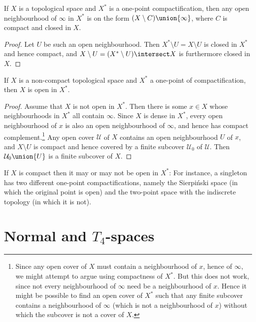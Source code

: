 \documentclass[article, a4paper, 11pt, oneside]{memoir}
\numberwithin{equation}{chapter}
\newcommand{\calU}{\mathcal{U}}
\begin{document}
\begin{lemma}
    If $X$ is a topological space and $X^*$ is a one-point compactification, then any open neighbourhood of $\infty$ in $X^*$ is on the form $(X \setminus C) \union \{\infty\}$, where $C$ is compact and closed in $X$.
\end{lemma}

\begin{proof}
    Let $U$ be such an open neighbourhood. Then $X^* \setminus U = X \setminus U$ is closed in $X^*$ and hence compact, and $X \setminus U = (X^* \setminus U) \intersect X$ is furthermore closed in $X$.
\end{proof}


\begin{lemma}
    If $X$ is a non-compact topological space and $X^*$ a one-point of compactification, then $X$ is open in $X^*$.
\end{lemma}

\begin{proof}
    Assume that $X$ is not open in $X^*$. Then there is some $x \in X$ whose neighbourhoods in $X^*$ all contain $\infty$. Since $X$ is dense in $X^*$, every open neighbourhood of $x$ is also an open neighbourhood of $\infty$, and hence has compact complement.\footnote{Since any open cover of $X$ must contain a neighbourhood of $x$, hence of $\infty$, we might attempt to argue using compactness of $X^*$. But this does not work, since not every neighbourhood of $\infty$ need be a neighbourhood of $x$. Hence it might be possible to find an open cover of $X^*$ such that any finite subcover contains a neighbourhood of $\infty$ (which is not a neighbourhood of $x$) without which the subcover is not a cover of $X$.} Any open cover $\calU$ of $X$ contains an open neighbourhood $U$ of $x$, and $X \setminus U$ is compact and hence covered by a finite subcover $\calU_0$ of $\calU$. Then $\calU_0 \union \{U\}$ is a finite subcover of $X$.
\end{proof}


If $X$ is compact then it may or may not be open in $X^*$: For instance, a singleton has two different one-point compactifications, namely the Sierpi\'nski space (in which the original point is open) and the two-point space with the indiscrete topology (in which it is not).



\chapter[Normal and T4-spaces]{Normal and $T_4$-spaces}
\end{document}
